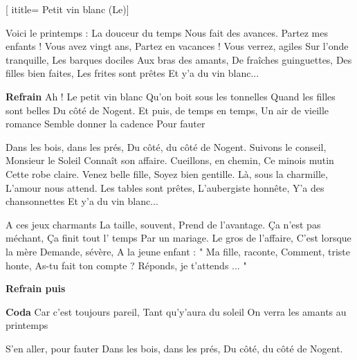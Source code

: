  [
ititle= {Petit vin blanc (Le)}]


\fbeginverse 
Voici le printemps :
La douceur du temps
Nous fait des avances.
Partez mes enfants !
Vous avez vingt ans,
Partez en vacances !
Vous verrez, agiles
Sur l'onde tranquille,
Les barques dociles
Aux bras des amants,
De fraîches guinguettes,
Des filles bien faites,
Les frites sont prêtes
Et y'a du vin blanc...
\endverse

\beginchorus
\textbf {Refrain}
Ah ! Le petit vin blanc
Qu'on boit sous les tonnelles
Quand les filles sont belles
Du côté de Nogent.
Et puis, de temps en temps,
Un air de vieille romance
Semble donner la cadence
{Pour fauter}
\endchorus

\beginverse
Dans les bois, dans les prés,
Du côté, du côté de Nogent.
Suivons le conseil,
Monsieur le Soleil
Connaît son affaire.
Cueillons, en chemin,
Ce minois mutin
Cette robe claire.
Venez belle fille,
Soyez bien gentille.
Là, sous la charmille,
L'amour nous attend.
Les tables sont prêtes,
L'aubergiste honnête,
Y'a des chansonnettes
Et y'a du vin blanc...
\endverse

\beginverse
A ces jeux charmants
La taille, souvent,
Prend de l'avantage.
Ça n'est pas méchant,
Ça finit tout l' temps
Par un mariage.
Le gros de l'affaire,
C'est lorsque la mère
Demande, sévère,
A la jeune enfant :
" Ma fille, raconte,
Comment, triste honte,
As-tu fait ton compte ?
Réponds, je t'attends ... "
\endverse

\beginchorus
\textbf {Refrain puis}
\endchorus

\beginverse
\textbf {Coda}
Car c'est toujours pareil,
Tant qu'y'aura du soleil
On verra les amants au printemps
\endverse

\beginverse
S'en aller, pour fauter
Dans les bois, dans les prés,
Du côté, du côté de Nogent.
\endverse

\endsong